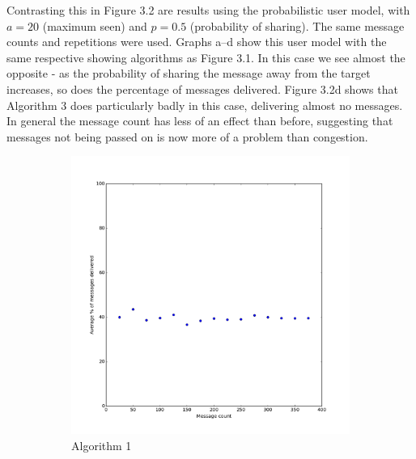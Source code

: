 \documentclass[bsc,frontabs,twoside,singlespacing,parskip,deptreport]{infthesis}     %
\begin{document}
Contrasting this in Figure 3.2 are results using the probabilistic user model, with $a = 20$ (maximum seen) and $p = 0.5$ (probability of sharing). The same message counts and repetitions were used. Graphs a--d show this user model with the same respective showing algorithms as Figure 3.1. In this case we see almost the opposite - as the probability of sharing the message away from the target increases, so does the percentage of messages delivered. Figure 3.2d shows that Algorithm 3 does particularly badly in this case, delivering almost no messages. In general the message count has less of an effect than before, suggesting that messages not being passed on is now more of a problem than congestion.

\begin{figure}
  	\vspace{-15pt}
    \centering
    \begin{subfigure}[b]{0.3\textwidth}
        \includegraphics[width=\textwidth]{results/Prob50Share_Prob0}
        \caption{Algorithm 1}
        \label{fig:results/Prob50Share_Prob0}
    \end{subfigure}
    ~ %
    \begin{subfigure}[b]{0.3\textwidth}

\end{subfigure}
\end{figure}
\end{document}
